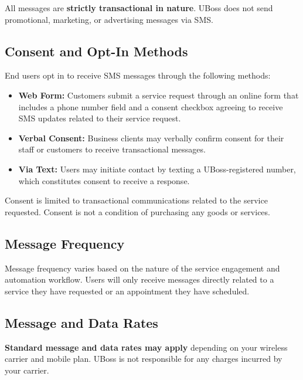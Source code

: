\documentclass[11pt, letterpaper]{article}
\begin{document}
All messages are \textbf{strictly transactional in nature}. UBoss does not send
promotional, marketing, or advertising messages via SMS.

\subsection{Consent and Opt-In Methods}

End users opt in to receive SMS messages through the following methods:

\begin{itemize}
    \item \textbf{Web Form:} Customers submit a service request through an online form
          that includes a phone number field and a consent checkbox agreeing to receive
          SMS updates related to their service request.

    \item \textbf{Verbal Consent:} Business clients may verbally confirm consent for
          their staff or customers to receive transactional messages.

    \item \textbf{Via Text:} Users may initiate contact by texting a UBoss-registered
          number, which constitutes consent to receive a response.
\end{itemize}

Consent is limited to transactional communications related to the service requested.
Consent is not a condition of purchasing any goods or services.

\subsection{Message Frequency}

Message frequency varies based on the nature of the service engagement and automation
workflow. Users will only receive messages directly related to a service they have
requested or an appointment they have scheduled.

\subsection{Message and Data Rates}

\begin{tcolorbox}[keyhighlight]
\textbf{Standard message and data rates may apply} depending on your wireless carrier
and mobile plan. UBoss is not responsible for any charges incurred by your carrier.
\end{tcolorbox}
\end{document}
